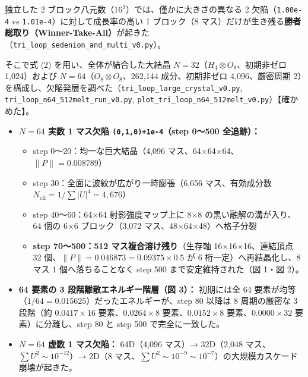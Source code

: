 \documentclass[
  a4paper,
]{ltjsarticle}
\providecommand{\tightlist}{%
  \setlength{\itemsep}{0pt}\setlength{\parskip}{0pt}}
\begin{document}
独立した 2 ブロック八元数（\(16^3\)）では、僅かに大きさの異なる 2
欠陥（\texttt{1.00e-4} vs \texttt{1.01e-4}）に対して成長率の高い 1
ブロック（8
マス）だけが生き残る\textbf{勝者総取り（Winner-Take-All）}が起きた（\texttt{tri\_\allowbreak{}loop\_\allowbreak{}sedenion\_\allowbreak{}and\_\allowbreak{}multi\_\allowbreak{}v0.py}）。

そこで式 (2) を用い、全体が結合した大結晶
\(N = 32\)（\(H_4 \otimes O_8\)、初期非ゼロ 1,024）および
\(N = 64\)（\(O_8 \otimes O_8\)、262,144 成分、初期非ゼロ
4,096、厳密周期
2）を構成し、欠陥発展を調べた（\texttt{tri\_\allowbreak{}loop\_\allowbreak{}large\_\allowbreak{}crystal\_\allowbreak{}v0.py},
\texttt{tri\_\allowbreak{}loop\_\allowbreak{}n64\_\allowbreak{}512melt\_\allowbreak{}run\_\allowbreak{}v0.py},
\texttt{plot\_\allowbreak{}tri\_\allowbreak{}loop\_\allowbreak{}n64\_\allowbreak{}512melt\_\allowbreak{}v0.py}）【確かめた】。

\begin{itemize}
\tightlist
\item
  \textbf{\(N = 64\) 実数 1 マス欠陥 \texttt{(0,1,0)+1e-4}（step 0〜500
  全追跡）：}

  \begin{itemize}
  \tightlist
  \item
    step 0〜20：均一な巨大結晶（4,096
    マス、64×64×64、\(\|P\| = 0.008789\)）
  \item
    step 30：全面に波紋が広がり一時膨張（6,656 マス、有効成分数
    \(N_{\mathrm{eff}} = 1/\sum|U|^4 = 4,676\)）
  \item
    step 40〜60：64×64 射影強度マップ上に 8×8 の黒い融解の溝が入り、64
    個の 6×6 ブロック（3,072 マス、48×64×48）へ格子分裂
  \item
    \textbf{step 70〜500：512 マス複合溶け残り}（生存軸
    16×16×16、連結頂点 32 個、\(\|P\| = 0.046873 = 0.09375 \times 0.5\)
    が 6 桁一定）へ再結晶化し、8 マス 1 個へ落ちることなく step 500
    まで安定維持された（図 1・図 2）。
  \end{itemize}
\item
  \textbf{64 要素の 3 段階離散エネルギー階層（図 3）：} 初期には全 64
  要素が均等（\(1/64 = 0.015625\)）だったエネルギーが、step 80 以降は 8
  周期の厳密な 3 段階（約 \(0.0417 \times 16\) 要素、\(0.0264 \times 8\)
  要素、\(0.0152 \times 8\) 要素、\(0.0000 \times 32\)
  要素）に分離し、step 80 と step 500 で完全に一致した。
\item
  \textbf{\(N = 64\) 虚数 1 マス欠陥：} 64D（4,096 マス）→ 32D（2,048
  マス、\(\sum U^2 \sim 10^{-12}\)）→ 2D（8
  マス、\(\sum U^2 \sim 10^{-9} \sim 10^{-7}\)）の大規模カスケード崩壊が起きた。
\end{itemize}
\end{document}
